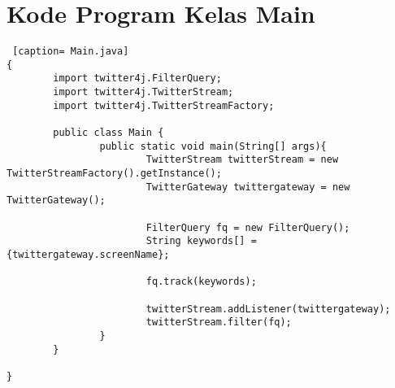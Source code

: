 \chapter{Kode Program Kelas Main}
\label{Kode Program Kelas Main}

\begin{lstlisting} [caption= Main.java]
{ 
		import twitter4j.FilterQuery;
		import twitter4j.TwitterStream;
		import twitter4j.TwitterStreamFactory;

		public class Main {
				public static void main(String[] args){
						TwitterStream twitterStream = new TwitterStreamFactory().getInstance();
						TwitterGateway twittergateway = new TwitterGateway();
						
						FilterQuery fq = new FilterQuery();
						String keywords[] = {twittergateway.screenName};

						fq.track(keywords);

						twitterStream.addListener(twittergateway);
						twitterStream.filter(fq);
				}
		}

}
\end{lstlisting}